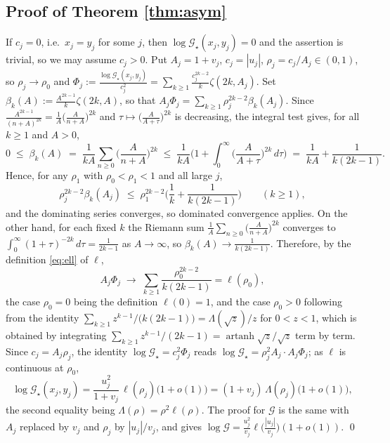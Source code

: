 \documentclass[11pt,a4paper]{amsart}
\theoremstyle{definition}
\newcommand{\Gg}{\mathcal{G}}
\newcommand{\Gs}{\mathcal{G}_{\star}}
\DeclareMathOperator{\artanh}{artanh}
\begin{document}
\subsection{Proof of Theorem \ref{thm:asym}}
If $c_{j}=0$, i.e.\ $x_{j}=y_{j}$ for some $j$, then $\log\Gs(x_{j},y_{j})=0$ and the
assertion is trivial, so we may assume $c_{j}>0$. Put $A_{j}=1+v_{j}$, $c_{j}=|u_{j}|$,
$\rho_{j}=c_{j}/A_{j}\in(0,1)$, so $\rho_{j}\to\rho_{0}$ and
$\Phi_{j}:=\frac{\log\Gs(x_{j},y_{j})}{c_{j}^{2}}
=\sum_{k\ge1}\frac{c_{j}^{2k-2}}{k}\zeta(2k,A_{j})$. Set
$\beta_{k}(A):=\frac{A^{2k-1}}{k}\zeta(2k,A)$, so that
$A_{j}\Phi_{j}=\sum_{k\ge1}\rho_{j}^{2k-2}\beta_{k}(A_{j})$. Since
$\frac{A^{2k-1}}{(n+A)^{2k}}=\frac1A\big(\frac{A}{n+A}\big)^{2k}$ and
$\tau\mapsto\big(\frac{A}{A+\tau}\big)^{2k}$ is decreasing, the integral test gives, for all
$k\ge1$ and $A>0$,
\begin{equation}\label{eq:EM}
  0\;\le\;\beta_{k}(A)\;=\;\frac{1}{kA}\sum_{n\ge0}\Big(\frac{A}{n+A}\Big)^{2k}
  \;\le\;\frac{1}{kA}\Big(1+\int_{0}^{\infty}\Big(\frac{A}{A+\tau}\Big)^{2k}\,d\tau\Big)
  \;=\;\frac{1}{kA}+\frac{1}{k(2k-1)} .
\end{equation}
Hence, for any $\rho_{1}$ with $\rho_{0}<\rho_{1}<1$ and all large $j$,
\[
  \rho_{j}^{2k-2}\beta_{k}(A_{j})\;\le\;\rho_{1}^{2k-2}\Big(\frac{1}{k}+\frac{1}{k(2k-1)}\Big)
  \qquad(k\ge1),
\]
and the dominating series converges, so dominated convergence applies. On the other hand,
for each fixed $k$ the Riemann sum $\frac1A\sum_{n\ge0}\big(\frac{A}{n+A}\big)^{2k}$
converges to $\int_{0}^{\infty}(1+\tau)^{-2k}\,d\tau=\frac{1}{2k-1}$ as $A\to\infty$, so
$\beta_{k}(A)\to\frac{1}{k(2k-1)}$. Therefore, by the definition \eqref{eq:ell} of $\ell$,
\[
  A_{j}\Phi_{j}\;\longrightarrow\;\sum_{k\ge1}\frac{\rho_{0}^{2k-2}}{k(2k-1)}
   =\ell(\rho_{0}),
\]
the case $\rho_{0}=0$ being the definition $\ell(0)=1$, and the case $\rho_{0}>0$ following
from the identity $\sum_{k\ge1}z^{k-1}/\big(k(2k-1)\big)=\Lambda(\sqrt z)/z$ for $0<z<1$,
which is obtained by integrating $\sum_{k\ge1}z^{k-1}/(2k-1)=\artanh\sqrt z/\sqrt z$ term by
term. Since $c_{j}=A_{j}\rho_{j}$, the identity $\log\Gs=c_{j}^{2}\Phi_{j}$ reads
$\log\Gs=\rho_{j}^{2}A_{j}\cdot A_{j}\Phi_{j}$; as $\ell$ is continuous at $\rho_{0}$,
\[
  \log\Gs(x_{j},y_{j})
   =\frac{u_{j}^{2}}{1+v_{j}}\,\ell(\rho_{j})\big(1+o(1)\big)
   =(1+v_{j})\,\Lambda(\rho_{j})\big(1+o(1)\big),
\]
the second equality being $\Lambda(\rho)=\rho^{2}\ell(\rho)$. The proof for $\Gg$ is the same
with $A_{j}$ replaced by $v_{j}$ and $\rho_{j}$ by $|u_{j}|/v_{j}$, and gives
$\log\Gg=\frac{u_{j}^{2}}{v_{j}}\ell\big(\frac{|u_{j}|}{v_{j}}\big)(1+o(1))$. \qed
\end{document}
